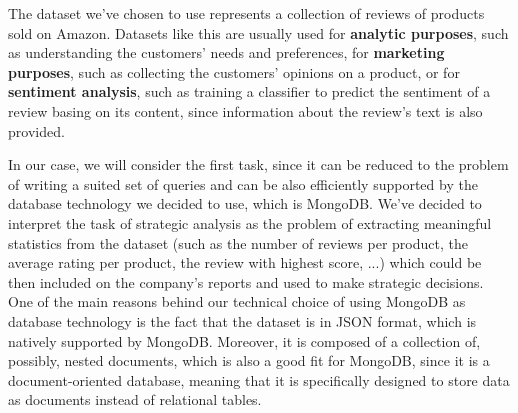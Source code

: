 The dataset we've chosen to use represents a collection of reviews of products sold on Amazon. 
Datasets like this are usually used for \textbf{analytic purposes}, such as understanding the customers' needs and preferences, for \textbf{marketing purposes}, such as collecting the customers' opinions on a product, or for \textbf{sentiment analysis}, such as training a classifier to predict the sentiment of a review basing on its content, since information about the review's text is also provided.

In our case, we will consider the first task, since it can be reduced to the problem of writing a suited set of queries and can be also efficiently supported by the database technology we decided to use, which is MongoDB.
We've decided to interpret the task of strategic analysis as the problem of extracting meaningful statistics from the dataset (such as the number of reviews per product, the average rating per product, the review with highest score, ...) which could be then included on the company's reports and used to make strategic decisions.\\

One of the main reasons behind our technical choice of using MongoDB as database technology is the fact that the dataset is in JSON format, which is natively supported by MongoDB. 
Moreover, it is composed of a collection of, possibly, nested documents, which is also a good fit for MongoDB, since it is a document-oriented database, meaning that it is specifically designed to store data as documents instead of relational tables.